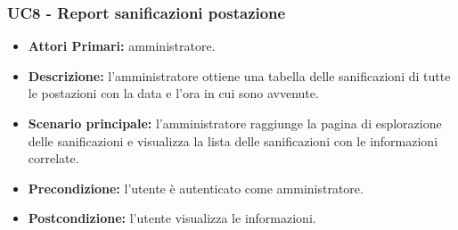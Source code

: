 \subsubsection{ UC8 - Report sanificazioni postazione}
\begin{itemize}
           	\item\textbf{Attori Primari:} 
           	amministratore.
           	\item\textbf{Descrizione:} 
           	l'amministratore ottiene una tabella delle sanificazioni di tutte le postazioni con la data e l'ora in cui sono avvenute.
           	\item\textbf{Scenario principale:} 
           	l'amministratore raggiunge la pagina di esplorazione delle sanificazioni e visualizza la lista delle sanificazioni con le informazioni correlate.
           	\item\textbf{Precondizione:} 
           	l'utente è autenticato come amministratore.
           	\item\textbf{Postcondizione:}
           	l'utente visualizza le informazioni.
\end{itemize}

